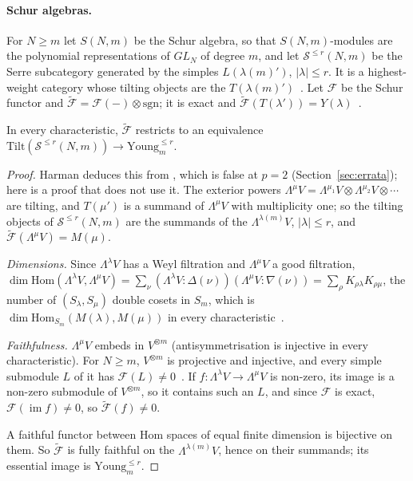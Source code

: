 \paragraph{Schur algebras.}  For $N\ge m$ let $S(N,m)$ be the Schur algebra, so that
$S(N,m)$-modules are the polynomial representations of $GL_N$ of degree $m$, and let
$\mathcal S^{\le r}(N,m)$ be the Serre subcategory generated by the simples
$L(\lambda(m)')$, $|\lambda|\le r$.  It is a highest-weight category whose tilting objects
are the $T(\lambda(m)')$~\cite[Prop.~1.3 and proof of Thm.~2.8]{harman2015}.  Let $\mathcal F$
be the Schur functor and $\tilde{\mathcal F}=\mathcal F(-)\otimes\mathrm{sgn}$; it is exact and
$\tilde{\mathcal F}(T(\lambda'))=Y(\lambda)$~\cite[Cor.~1.8(1),(2)]{harman2015}.

\begin{lemma}\label{lem:R1}
In every characteristic, $\tilde{\mathcal F}$ restricts to an equivalence
$\mathrm{Tilt}(\mathcal S^{\le r}(N,m))\to\mathrm{Young}^{\le r}_m$.
\end{lemma}

\begin{proof}
Harman deduces this from \cite[Cor.~1.8(4)]{harman2015}, which is false at $p=2$
(Section~\ref{sec:errata}); here is a proof that does not use it.  The exterior powers
$\Lambda^\mu V=\Lambda^{\mu_1}V\otimes\Lambda^{\mu_2}V\otimes\cdots$ are tilting, and
$T(\mu')$ is a summand of $\Lambda^\mu V$ with multiplicity one; so the tilting objects of
$\mathcal S^{\le r}(N,m)$ are the summands of the $\Lambda^{\lambda(m)}V$, $|\lambda|\le r$,
and $\tilde{\mathcal F}(\Lambda^\mu V)=M(\mu)$.

\emph{Dimensions.}  Since $\Lambda^\lambda V$ has a Weyl filtration and $\Lambda^\mu V$ a
good filtration,
$\dim\mathrm{Hom}(\Lambda^\lambda V,\Lambda^\mu V)=\sum_\nu(\Lambda^\lambda V:\Delta(\nu))
(\Lambda^\mu V:\nabla(\nu))=\sum_\rho K_{\rho\lambda}K_{\rho\mu}$, the number of
$(S_\lambda,S_\mu)$ double cosets in $S_m$, which is
$\dim\mathrm{Hom}_{S_m}(M(\lambda),M(\mu))$ in every
characteristic~\cite[13.19]{james1978}.

\emph{Faithfulness.}  $\Lambda^\mu V$ embeds in $V^{\otimes m}$ (antisymmetrisation is injective
in every characteristic).  For $N\ge m$, $V^{\otimes m}$ is projective and injective, and every
simple submodule $L$ of it has $\mathcal F(L)\ne0$~\cite[\S6]{green1980}.  If
$f\colon\Lambda^\lambda V\to\Lambda^\mu V$ is non-zero, its image is a non-zero submodule of
$V^{\otimes m}$, so it contains such an $L$, and since $\mathcal F$ is exact,
$\mathcal F(\operatorname{im}f)\ne0$, so $\tilde{\mathcal F}(f)\ne0$.

A faithful functor between Hom spaces of equal finite dimension is bijective on them.  So
$\tilde{\mathcal F}$ is fully faithful on the $\Lambda^{\lambda(m)}V$, hence on their summands;
its essential image is $\mathrm{Young}^{\le r}_m$.
\end{proof}

